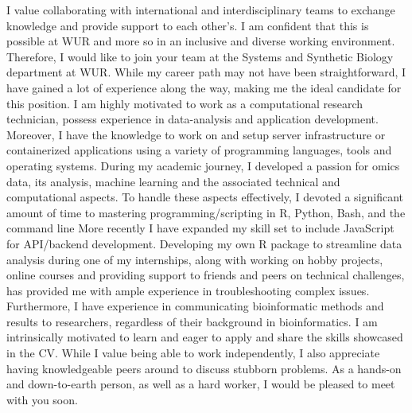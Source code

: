 \documentclass[11pt, a4paper]{awesome-cv}
\begin{document}
\begin{cvletter}
I value collaborating with international and interdisciplinary teams to exchange knowledge and provide support to each other’s.
I am confident that this is possible at WUR and more so in an inclusive and diverse working environment.
Therefore, I would like to join your team at the Systems and Synthetic Biology department at WUR.
While my career path may not have been straightforward, I have gained a lot of experience along the way, making me the ideal candidate for this position. 
I am highly motivated to work as a computational research technician, possess experience in data-analysis and application development.
Moreover, I have the knowledge to work on and setup server infrastructure or containerized applications using a variety of programming languages, tools and operating systems.
During my academic journey, I developed a passion for omics data, its analysis, machine learning and the associated technical and computational aspects. 
To handle these aspects effectively, I devoted a significant amount of time to mastering programming/scripting in R, Python, Bash, and the command line
More recently I have expanded my skill set to include JavaScript for API/backend development.
Developing my own R package to streamline data analysis during one of my internships, along with working on hobby projects, online courses and providing support to friends and peers on technical challenges, has provided me with ample experience in troubleshooting complex issues. 
Furthermore, I have experience in communicating bioinformatic methods and results to researchers, regardless of their background in bioinformatics.
I am intrinsically motivated to learn and eager to apply and share the skills showcased in the CV. 
While I value being able to work independently, I also appreciate having knowledgeable peers around to discuss stubborn problems. 
As a hands-on and down-to-earth person, as well as a hard worker, I would be pleased to meet with you soon.

\end{cvletter}
\makeletterclosing
\end{document}

